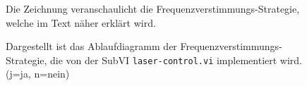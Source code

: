 \begin{figure}[h]
 	\centering
	\caption[Frequenzverstimmungs-Strategie]{Die
	Zeichnung veranschaulicht die Frequenzverstimmungs-Strategie,
	welche im Text näher erklärt wird.}\label{fig:frequenzverstimmungs-strategie}
\end{figure}
\begin{figure}[hp]
 	\centering
	\caption[Frequenzverstimmungs-Strategie
	-
	Ablaufdiagramm]{Dargestellt ist das	Ablaufdiagramm der
	Frequenzverstimmungs-Strategie, die von der SubVI \lstinline|laser-control.vi|
	implementiert wird. (j=ja, n=nein)}
	\label{fig:frequenzverstimmungs-strategie_ablaufdiagramm}
\end{figure}

